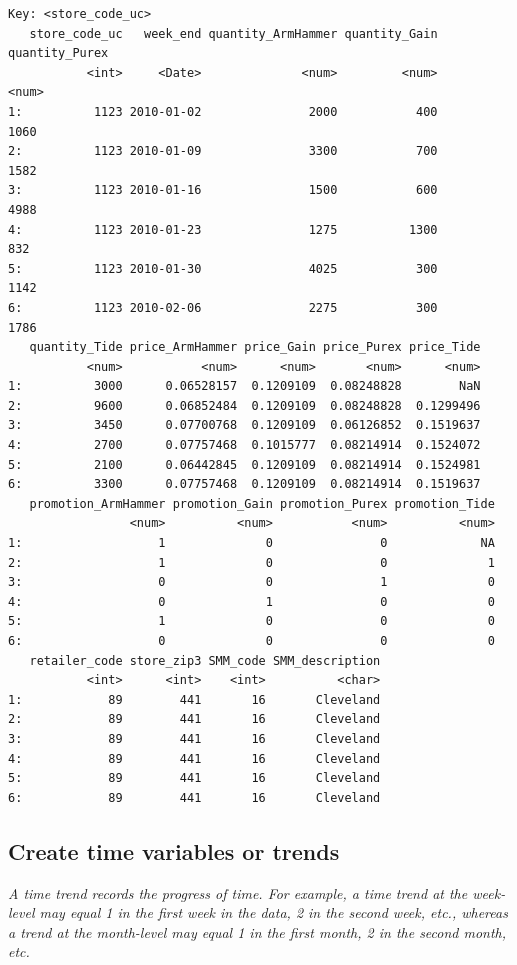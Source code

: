 \documentclass[
]{article}
\begin{document}
\begin{verbatim}
Key: <store_code_uc>
   store_code_uc   week_end quantity_ArmHammer quantity_Gain quantity_Purex
           <int>     <Date>              <num>         <num>          <num>
1:          1123 2010-01-02               2000           400           1060
2:          1123 2010-01-09               3300           700           1582
3:          1123 2010-01-16               1500           600           4988
4:          1123 2010-01-23               1275          1300            832
5:          1123 2010-01-30               4025           300           1142
6:          1123 2010-02-06               2275           300           1786
   quantity_Tide price_ArmHammer price_Gain price_Purex price_Tide
           <num>           <num>      <num>       <num>      <num>
1:          3000      0.06528157  0.1209109  0.08248828        NaN
2:          9600      0.06852484  0.1209109  0.08248828  0.1299496
3:          3450      0.07700768  0.1209109  0.06126852  0.1519637
4:          2700      0.07757468  0.1015777  0.08214914  0.1524072
5:          2100      0.06442845  0.1209109  0.08214914  0.1524981
6:          3300      0.07757468  0.1209109  0.08214914  0.1519637
   promotion_ArmHammer promotion_Gain promotion_Purex promotion_Tide
                 <num>          <num>           <num>          <num>
1:                   1              0               0             NA
2:                   1              0               0              1
3:                   0              0               1              0
4:                   0              1               0              0
5:                   1              0               0              0
6:                   0              0               0              0
   retailer_code store_zip3 SMM_code SMM_description
           <int>      <int>    <int>          <char>
1:            89        441       16       Cleveland
2:            89        441       16       Cleveland
3:            89        441       16       Cleveland
4:            89        441       16       Cleveland
5:            89        441       16       Cleveland
6:            89        441       16       Cleveland
\end{verbatim}

\subsection{Create time variables or
trends}\label{create-time-variables-or-trends}

\emph{A time trend records the progress of time. For example, a time
trend at the week-level may equal 1 in the first week in the data, 2 in
the second week, etc., whereas a trend at the month-level may equal 1 in
the first month, 2 in the second month, etc.}
\end{document}
